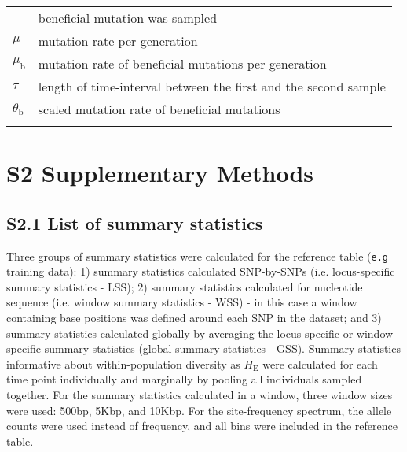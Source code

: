 \documentclass[a4paper, 12pt]{article}
\begin{document}
\begin{table}[ht]
\begin{tabular}{ll}
                            & beneficial mutation was sampled\\
    $\mu$                   & mutation rate per generation\\
    $\mu_{\mathrm{b}}$      & mutation rate of beneficial mutations per generation\\
    $\tau$                  & length of time-interval between the first and the second sample\\
    $\theta_{\mathrm{b}}$   & scaled mutation rate of beneficial mutations\\
&\\
    
    \bottomrule
  \end{tabular}
  \label{tab:supple_symbols}
\end{table}

\section*{S2 Supplementary Methods}

\subsection*{S2.1 List of summary statistics}

Three groups of summary statistics were calculated for the reference table (\texttt{e.g} training data): 1) summary statistics calculated SNP-by-SNPs (i.e. locus-specific summary statistics - LSS); 2) summary statistics calculated for nucleotide sequence (i.e. window summary statistics - WSS) - in this case a window containing base positions was defined around each SNP in the dataset; and 3) summary statistics calculated globally by averaging the locus-specific or window-specific summary statistics (global summary statistics - GSS). Summary statistics informative about within-population diversity as $H_{\mathrm{E}}$ were calculated for each time point individually and marginally by pooling all individuals sampled together. For the summary statistics calculated in a window, three window sizes were used: 500bp, 5Kbp, and 10Kbp. For the site-frequency spectrum, the allele counts were used instead of frequency, and all bins were included in the reference table.
\end{document}
